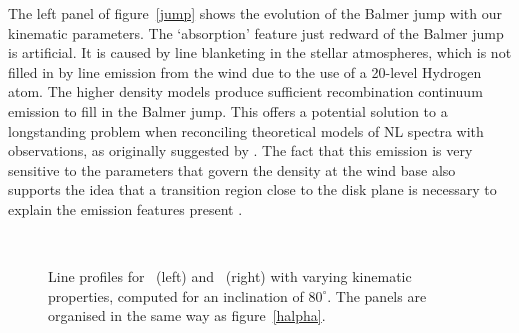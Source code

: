 \documentclass[preprint, a4paper, 11pt]{aastex}
\begin{document}
The left panel of figure~\ref{jump} shows the evolution
of the Balmer jump with our kinematic parameters. 
The `absorption' feature just redward of the Balmer jump
is artificial. It is caused by line blanketing in the stellar atmospheres,
which is not filled in by line emission from the wind
due to the use of a 20-level Hydrogen atom.
The higher density models
produce sufficient recombination continuum emission to fill 
in the Balmer jump. This offers a potential solution to a 
longstanding problem when reconciling theoretical
models of NL spectra with observations, as originally suggested by
\cite{KLWB98}. The fact that this emission is very sensitive to the parameters
that govern the density at the wind base also supports
the idea that a transition region close to the disk plane is necessary
to explain the emission features present \citep{kd1997}.



\begin{figure} %
\mbox{
\quad
{}   
}
\caption{
Line profiles for \heiiuv\ (left) and \heiiopt\  (right) with varying kinematic 
properties, computed for an inclination of $80^\circ$. 
The panels are organised in the same way as figure~\ref{halpha}.
}
\label{heiifig}
\end{figure}
\end{document}
